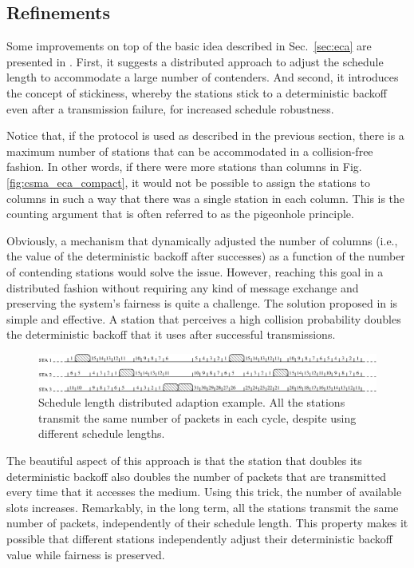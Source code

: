 \documentclass[journal]{IEEEtran}
\begin{document}
\subsection{Refinements}

Some improvements on top of the basic idea described in Sec.~\ref{sec:eca} are presented in \cite{fang2011dlm}. 
First, it suggests a distributed approach to adjust the schedule length to accommodate a large number of contenders.
And second, it introduces the concept of stickiness, whereby the stations stick to a deterministic backoff even after a transmission failure, for increased schedule robustness. 

Notice that, if the protocol is used as described in the previous section, there is a maximum number of stations that can be accommodated in a collision-free fashion.
In other words, if there were more stations than columns in Fig. \ref{fig:csma_eca_compact}, it would not be possible to assign the stations to columns in such a way that there was a single station in each column.
This is the counting argument that is often referred to as the pigeonhole principle.

Obviously, a mechanism that dynamically adjusted the number of columns (i.e., the value of the deterministic backoff after successes) as a function of the number of contending stations would solve the issue.
However, reaching this goal in a distributed fashion without requiring any kind of message exchange and preserving the system's fairness is quite a challenge.
The solution proposed in \cite{fang2011dlm} is simple and effective.
A station that perceives a high collision probability doubles the deterministic backoff that it uses after successful transmissions.

\begin{figure}[!t]
\centering
\includegraphics[width=6.0in]{figures/csma_eca_different_backoff}
\caption{Schedule length distributed adaption example. All the stations transmit the same number of packets in each cycle, despite using different schedule lengths.}
\label{fig:csma_eca_different_backoff}
\end{figure}

The beautiful aspect of this approach is that the station that doubles its deterministic backoff also doubles the number of packets that are transmitted every time that it accesses the medium.
Using this trick, the number of available slots increases.
Remarkably, in the long term, all the stations transmit the same number of packets, independently of their schedule length.
This property makes it possible that different stations independently adjust their deterministic backoff value while fairness is preserved.
\end{document}

